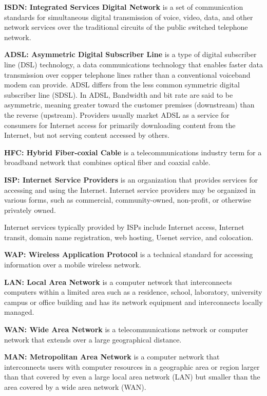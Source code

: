 \begin{enumerate}
	\qquad \textbf{ISDN: Integrated Services Digital Network} is a set of communication standards for simultaneous digital transmission of voice, video, data, and other network services over the traditional circuits of the public switched telephone network.
	
	\qquad \textbf{ADSL: Asymmetric Digital Subscriber Line} is a type of digital subscriber line (DSL) technology, a data communications technology that enables faster data transmission over copper telephone lines rather than a conventional voiceband modem can provide. ADSL differs from the less common symmetric digital subscriber line (SDSL). In ADSL, Bandwidth and bit rate are said to be asymmetric, meaning greater toward the customer premises (downstream) than the reverse (upstream). Providers usually market ADSL as a service for consumers for Internet access for primarily downloading content from the Internet, but not serving content accessed by others.
	
	\qquad \textbf{HFC: Hybrid Fiber-coxial Cable} is a telecommunications industry term for a broadband network that combines optical fiber and coaxial cable.
	
	\qquad \textbf{ISP: Internet Service Providers} is an organization that provides services for accessing and using the Internet. Internet service providers may be organized in various forms, such as commercial, community-owned, non-profit, or otherwise privately owned.

    Internet services typically provided by ISPs include Internet access, Internet transit, domain name registration, web hosting, Usenet service, and colocation.
	
	\qquad \textbf{WAP: Wireless Application Protocol} is a technical standard for accessing information over a mobile wireless network.
			
	\qquad \textbf{LAN: Local Area Network} is a computer network that interconnects computers within a limited area such as a residence, school, laboratory, university campus or office building and has its network equipment and interconnects locally managed.
	 
	\qquad \textbf{WAN: Wide Area Network} is a telecommunications network or computer network that extends over a large geographical distance.
	
	\qquad \textbf{MAN: Metropolitan Area Network} is a computer network that interconnects users with computer resources in a geographic area or region larger than that covered by even a large local area network (LAN) but smaller than the area covered by a wide area network (WAN).
	

\end{enumerate}
